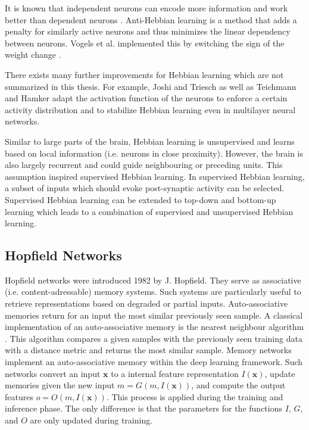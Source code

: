 It is known that independent neurons can encode more information and work better than dependent neurons .
Anti-Hebbian learning is a method that adds a penalty for similarly active neurons and thus minimizes the linear dependency between neurons.
Vogels et al. implemented this by switching the sign of the weight change .

There exists many further improvements for Hebbian learning which are not summarized in this thesis.
For example, Joshi and Triesch  as well as Teichmann and Hamker  adapt the activation function of the neurons to enforce a certain activity distribution and to stabilize Hebbian learning even in multilayer neural networks.

Similar to large parts of the brain, Hebbian learning is unsupervised and learns based on local information (i.e. neurons in close proximity).
However, the brain is also largely recurrent and could guide neighbouring or preceding units.
This assumption inspired supervised Hebbian learning.
In supervised Hebbian learning, a subset of inputs which should evoke post-synaptic activity can be selected.
Supervised Hebbian learning can be extended to top-down and bottom-up learning  which leads to a combination of supervised and unsupervised Hebbian learning.


\subsection{Hopfield Networks}
Hopfield networks  were introduced 1982 by J. Hopfield.
They serve as associative (i.e. content-adressable) memory systems.
Such systems are particularly useful to retrieve representations based on degraded or partial inputs.
Auto-associative memories return for an input the most similar previously seen sample.
A classical implementation of an auto-associative memory is the nearest neighbour algorithm .
This algorithm compares a given samples with the previously seen training data with a distance metric and returns the most similar sample.
Memory networks  implement an auto-associative memory within the deep learning framework.
Such networks convert an input \(\boldsymbol{x}\) to a internal feature representation \(I(\boldsymbol{x})\), update memories given the new input \(m=G(m, I(\boldsymbol{x}))\), and compute the output features \(o=O(m, I(\boldsymbol{x}))\).
This process is applied during the training and inference phase.
The only difference is that the parameters for the functions \(I\), \(G\), and \(O\) are only updated during training.

